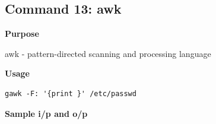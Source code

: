 \subsection{Command 13: awk} 
\textbf{Purpose}
\begin{flushleft}
       awk - pattern-directed scanning and processing language
\end{flushleft}
\textbf{Usage}
\begin{verbatim}
gawk -F: '{print }' /etc/passwd
\end{verbatim}
\textbf{Sample i/p and o/p}
\begin{figure}[H] 
\end{figure}
